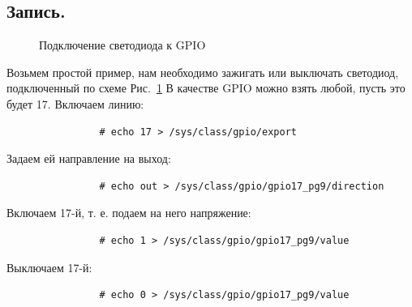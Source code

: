 \documentclass[a4paper,12pt]{report} %
\begin{document}
			\subsection{Запись.}
				\begin{figure}[h]
					\caption{Подключение светодиода к GPIO}
					\label{ris:led}
				\end{figure}
				Возьмем простой пример, нам необходимо зажигать или выключать светодиод,
				подключенный по схеме Рис.~\ref{ris:led}
				В качестве GPIO можно взять любой, пусть это будет 17. Включаем линию:
				\begin{verbatim}
				# echo 17 > /sys/class/gpio/export
				\end{verbatim}
				Задаем ей направление на выход:
				\begin{verbatim}
				# echo out > /sys/class/gpio/gpio17_pg9/direction
				\end{verbatim}
				Включаем 17-й, т. е. подаем на него напряжение:
				\begin{verbatim}
				# echo 1 > /sys/class/gpio/gpio17_pg9/value
				\end{verbatim} 
				Выключаем 17-й:
				\begin{verbatim}
				# echo 0 > /sys/class/gpio/gpio17_pg9/value
				\end{verbatim} 
\end{document}
